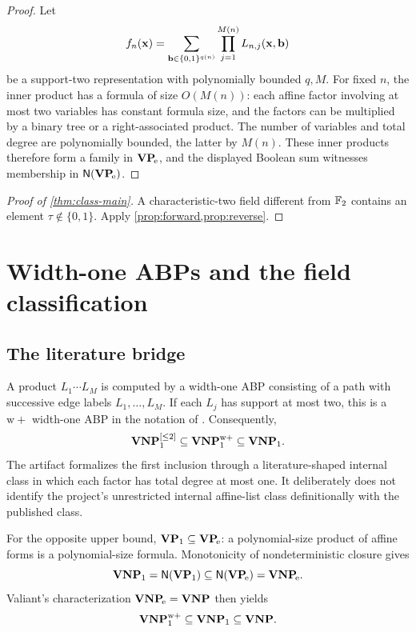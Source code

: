 \begin{proof}
Let
\[
 f_n(\mathbf{x})=
 \sum_{\mathbf{b}\in\{0,1\}^{q(n)}}\prod_{j=1}^{M(n)}L_{n,j}(\mathbf{x},\mathbf{b})
\]
be a support-two representation with polynomially bounded \(q,M\).  For fixed \(n\), the
inner product has a formula of size \(O(M(n))\): each affine factor involving at most two
variables has constant formula size, and the factors can be multiplied by a binary tree or
a right-associated product.  The number of variables and total degree are polynomially
bounded, the latter by \(M(n)\).  These inner products therefore form a family in
\(\mathbf{VP}_{\!\mathrm e}\), and the displayed Boolean sum witnesses membership in \(\mathsf{N}(\mathbf{VP}_{\!\mathrm e})\).
\end{proof}

\begin{proof}[Proof of \cref{thm:class-main}]
A characteristic-two field different from \(\mathbb{F}_2\) contains an element
\(\tau\notin\{0,1\}\).  Apply \cref{prop:forward,prop:reverse}.
\end{proof}

\section{Width-one ABPs and the field classification}\label{sec:classification}

\subsection{The literature bridge}

A product \(L_1\cdots L_M\) is computed by a width-one ABP consisting of a path with
successive edge labels \(L_1,\ldots,L_M\).  If each \(L_j\) has support at most two, this
is a \(\mathrm{w}+\) width-one ABP in the notation of
\cite{BringmannIkenmeyerZuiddam2018}.  Consequently,
\[
 \mathbf{VNP}_{1}^{[\le 2]}\subseteq\mathbf{VNP}_{1}^{\mathrm{w}+}\subseteq\mathbf{VNP}_{1}.
\]
The artifact formalizes the first inclusion through a literature-shaped internal class in
which each factor has total degree at most one.  It deliberately does not identify the
project's unrestricted internal affine-list class definitionally with the published class.

For the opposite upper bound, \(\mathbf{VP}_{1}\subseteq\mathbf{VP}_{\!\mathrm e}\): a polynomial-size product of affine
forms is a polynomial-size formula.  Monotonicity of nondeterministic closure gives
\[
 \mathbf{VNP}_{1}=\mathsf{N}(\mathbf{VP}_{1})
 \subseteq\mathsf{N}(\mathbf{VP}_{\!\mathrm e})=\mathbf{VNP}_{\!\mathrm e}.
\]
Valiant's characterization \(\mathbf{VNP}_{\!\mathrm e}=\mathbf{VNP}\) then yields
\[
 \mathbf{VNP}_{1}^{\mathrm{w}+}\subseteq\mathbf{VNP}_{1}\subseteq\mathbf{VNP}.
\]

